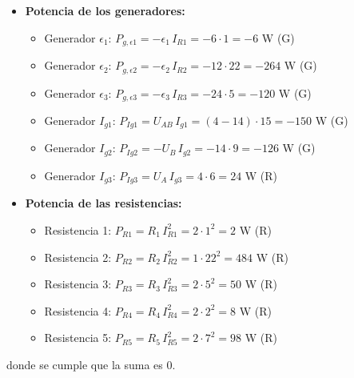 \documentclass[11pt]{book} %
\begin{document}
\begin{example}
\begin{itemize}
    \item \textbf{Potencia de los generadores:}
    \begin{itemize}
        \item Generador $\epsilon_1$: $P_{g,\epsilon1}=-\epsilon_1\,I_{R1}=-6\cdot 1=-6$ W (G)
        \item Generador $\epsilon_2$:  $P_{g,\epsilon2}=-\epsilon_2\,I_{R2}=-12\cdot 22=-264$ W (G)
        \item Generador $\epsilon_3$:  $P_{g,\epsilon3}=-\epsilon_3\,I_{R3}=-24\cdot 5=-120$ W (G)
        \item Generador $I_{g1}$: $P_{Ig1}=U_{AB}\,I_{g1}=(4-14)\cdot 15=-150$ W (G)
        \item Generador $I_{g2}$:  $P_{Ig2}=-U_B\,I_{g2}=-14\cdot 9=-126$ W (G)
        \item Generador $I_{g3}$:  $P_{Ig3}=U_{A}\,I_{g3}=4\cdot 6=24$ W (R)
    \end{itemize}
    \item \textbf{Potencia de las resistencias:}
    \begin{itemize}
        \item Resistencia 1: $P_{R1}=R_1\,I_{R1}^2=2\cdot 1^2=2$ W (R)
        \item Resistencia 2: $P_{R2}=R_2\,I_{R2}^2=1\cdot 22^2=484$ W (R)
        \item Resistencia 3: $P_{R3}=R_3\,I_{R3}^2=2\cdot 5^2=50$ W (R)
        \item Resistencia 4: $P_{R4}=R_4\,I_{R4}^2=2\cdot 2^2=8$ W (R)
        \item Resistencia 5: $P_{R5}=R_5\,I_{R5}^2=2\cdot 7^2=98$ W (R)
    \end{itemize}
\end{itemize}
donde se cumple que la suma es 0.
	\end{example}
	
\end{document}
